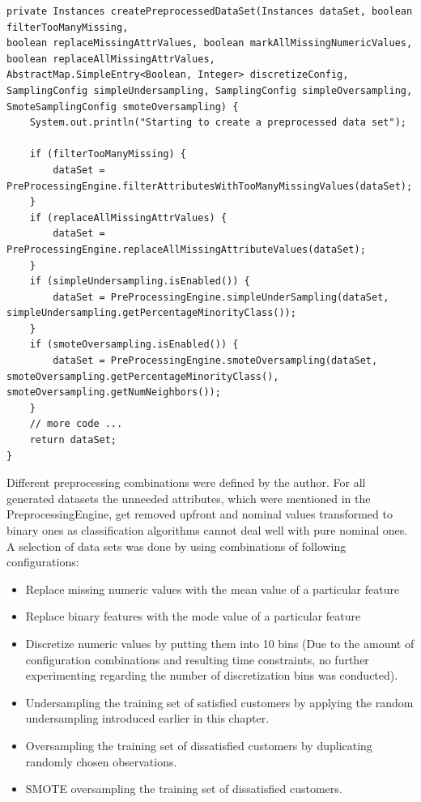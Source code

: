 \begin{lstlisting}[caption={DataSetCreator}, label={lst:dataSetCreator}]
private Instances createPreprocessedDataSet(Instances dataSet, boolean filterTooManyMissing,
boolean replaceMissingAttrValues, boolean markAllMissingNumericValues,
boolean replaceAllMissingAttrValues,
AbstractMap.SimpleEntry<Boolean, Integer> discretizeConfig,
SamplingConfig simpleUndersampling, SamplingConfig simpleOversampling,
SmoteSamplingConfig smoteOversampling) {
	System.out.println("Starting to create a preprocessed data set");
	
	if (filterTooManyMissing) {
		dataSet = PreProcessingEngine.filterAttributesWithTooManyMissingValues(dataSet);
	}
	if (replaceAllMissingAttrValues) {
		dataSet = PreProcessingEngine.replaceAllMissingAttributeValues(dataSet);
	}
	if (simpleUndersampling.isEnabled()) {
		dataSet = PreProcessingEngine.simpleUnderSampling(dataSet, simpleUndersampling.getPercentageMinorityClass());
	}
	if (smoteOversampling.isEnabled()) {
		dataSet = PreProcessingEngine.smoteOversampling(dataSet, smoteOversampling.getPercentageMinorityClass(), smoteOversampling.getNumNeighbors());
	}
	// more code ...
	return dataSet;
}
\end{lstlisting}

Different preprocessing combinations were defined by the author. For all generated datasets the unneeded attributes, which were mentioned in the PreprocessingEngine, get removed upfront and nominal values transformed to binary ones as classification algorithms cannot deal well with pure nominal ones. A selection of data sets was done by using combinations of following configurations:

\begin{itemize}
	\item Replace missing numeric values with the mean value of a particular feature 
	\item Replace binary features with the mode value of a particular feature
	\item Discretize numeric values by putting them into 10 bins (Due to the amount of configuration combinations and resulting time constraints, no further experimenting regarding the number of discretization bins was conducted).
	\item Undersampling the training set of satisfied customers by applying the random undersampling introduced earlier in this chapter.
	\item Oversampling the training set of dissatisfied customers by duplicating randomly chosen observations.
	\item SMOTE oversampling the training set of dissatisfied customers.
\end{itemize}

